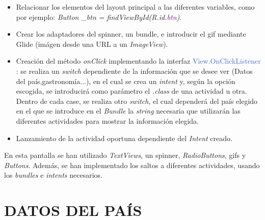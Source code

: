 \documentclass[letterpaper,twocolumn,openany,nodeprecatedcode,dvipsnames,nomultitoc]{dndbook}
\begin{document}
\begin{justify}
\par 
\begin{itemize}

    \item Relacionar los elementos del layout principal a las diferentes variables, como por ejemplo: \textit{Button \_btn = findViewById(R.id.\textcolor{purple}{btn})}.
    \vspace{5pt}
     
    \item Crear los adaptadores del spinner, un bundle, e introducir el gif mediante Glide (imágen desde una URL a un \textit{ImageView}).
    \vspace{5pt}
      
    \item Creación del método \textit{onClick} implementando la interfaz \textcolor{RoyalBlue}{View.OnClickListener} : se realiza un \textit{switch} dependiente de la información que se desee ver (Datos del país,gastronomía...), en el cual se crea un \textit{intent} y, según la opción escogida, se introducirá como parámetro el \textit{.class} de una actividad u otra. Dentro de cada case, se realiza otro \textit{switch}, el cual dependerá del país elegido en el que se introduce en el \textit{Bundle} la \textit{string} necesaria que utilizarán las diferentes actividades para mostrar la información elegida.
    \vspace{5pt}
    
    \item Lanzamiento de la actividad oportuna dependiente del \textit{Intent} creado.
    
\end{itemize}

\vspace{5pt}

\par
En esta pantalla se han utilizado \textit{TextViews}, un spinner, \textit{RadioButtons}, gifs y \textit{Buttons}. Además, se han implementado los saltos a diferentes actividades, usando los \textit{bundles} e \textit{intents} necesarios.


\section{DATOS DEL PAÍS}
\vspace{5pt}

\end{justify}
\end{document}
